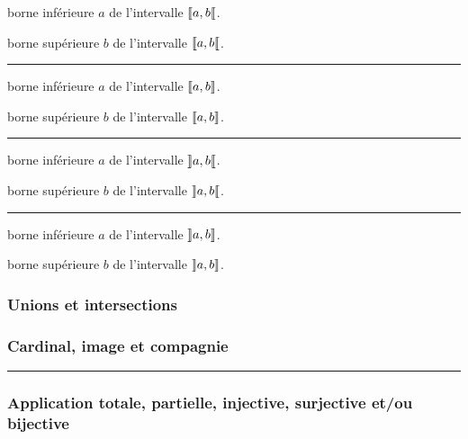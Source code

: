 \documentclass[12pt,a4paper]{article}
\theoremstyle{definition}
\newcommand\separation{
	\medskip
	\hfill\rule{0.5\textwidth}{0.75pt}\hfill
	\medskip
}
\begin{document}

 borne inférieure $a$ de l'intervalle $\ZintervalCO{a}{b}$.

 borne supérieure $b$ de l'intervalle $\ZintervalCO{a}{b}$.


\separation




 borne inférieure $a$ de l'intervalle $\ZintervalC{a}{b}$.

 borne supérieure $b$ de l'intervalle $\ZintervalC{a}{b}$.


\separation




 borne inférieure $a$ de l'intervalle $\ZintervalO{a}{b}$.

 borne supérieure $b$ de l'intervalle $\ZintervalO{a}{b}$.


\separation




 borne inférieure $a$ de l'intervalle $\ZintervalOC{a}{b}$.

 borne supérieure $b$ de l'intervalle $\ZintervalOC{a}{b}$.

\subsubsection{Unions et intersections}



\subsubsection{Cardinal, image et compagnie}




\separation





\subsubsection{Application totale, partielle, injective, surjective et/ou bijective}
\end{document}
